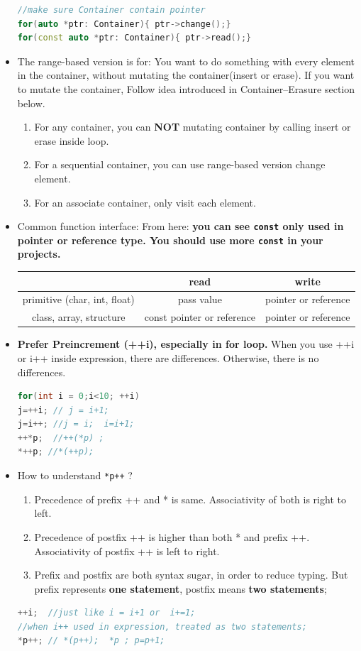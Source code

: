 \documentclass[a4paper,12pt,twoside]{book}
\begin{document}
\begin{itemize}
\begin{lstlisting}[frame=single, language=c++]
//make sure Container contain pointer
for(auto *ptr: Container){ ptr->change();}
for(const auto *ptr: Container){ ptr->read();}
\end{lstlisting}

\item The range-based version is for: You want to do something with every element in the container, without mutating the container(insert or erase). If you want to mutate the container, Follow idea introduced in Container--Erasure section below.

\begin{enumerate}
\item For any container, you can \textbf{NOT} mutating container by calling insert or erase inside loop.
\item For a sequential container, you can use range-based version change element.
\item For an associate container, only visit each element.
\end{enumerate}

\item Common function interface: From here: \textbf{you can see \texttt{const} only used in pointer or reference type. You should use more \texttt{const} in your projects. }

\begin{tabular}{|c|c|c|}
\hline
 & \textbf{read} & \textbf{write} \\
\hline
primitive (char, int, float) & pass value & pointer or reference \\
\hline
class, array, structure  & const pointer or reference &  pointer or reference  \\
\hline
\end{tabular}


\item \textbf{Prefer Preincrement (++i), especially in for loop.}  When you use ++i or i++ inside expression, there are differences. Otherwise, there is no differences.
\begin{lstlisting}[frame=single, language=c++]
for(int i = 0;i<10; ++i)
j=++i; // j = i+1;
j=i++; //j = i;  i=i+1;
++*p;  //++(*p) ;
*++p; //*(++p);
\end{lstlisting}

\item How to understand \texttt{*p++} ?
\begin{enumerate}
\item Precedence of prefix ++ and * is same. Associativity of both is right to left.
\item Precedence of postfix ++ is higher than both * and prefix ++. Associativity of postfix ++ is left to right.
\item Prefix and postfix are both syntax sugar, in order to reduce typing.   But prefix represents \textbf{one statement}, postfix means \textbf{two statements};
\end{enumerate}
\begin{lstlisting}[frame=single, language=c++]
++i;  //just like i = i+1 or  i+=1;
//when i++ used in expression, treated as two statements;
*p++; // *(p++);  *p ; p=p+1;


\end{lstlisting}
\end{itemize}
\end{document}
